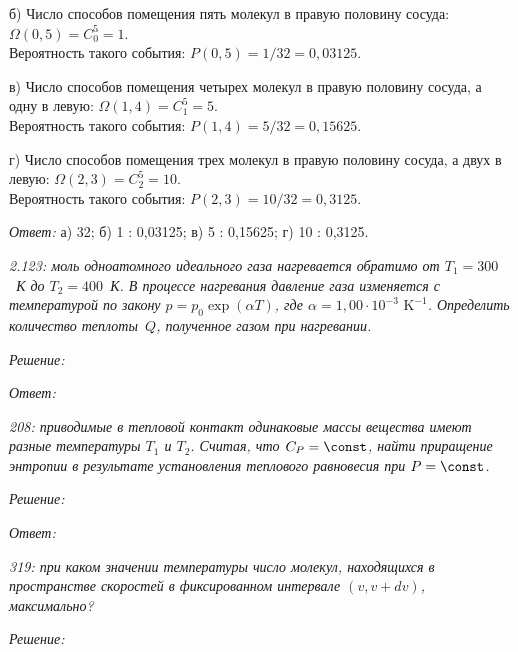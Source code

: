 \documentclass[pscyr]{hedsemwork}
\begin{document}
б) Число способов помещения пять молекул в правую половину сосуда:
\( \Omega(0, 5) = C_0^5 = 1 \).\\
Вероятность такого события: \( P(0, 5) = 1/32 = 0,\!03125 \).

в) Число способов помещения четырех молекул в правую половину сосуда, а одну в
левую: \( \Omega(1, 4) = C_1^5 = 5 \).\\
Вероятность такого события: \( P(1, 4) = 5/32 = 0,\!15625 \).

г) Число способов помещения трех молекул в правую половину сосуда, а двух в
левую: \( \Omega(2, 3) = C_2^5 = 10 \).\\
Вероятность такого события: \( P(2, 3) = 10/32 = 0,\!3125 \).

\vspace*{2em}
\emph{Ответ:} а) 32; б) 1 : 0,03125; в) 5 : 0,15625; г) 10 : 0,3125.

\newpage %

\emph{2.123: моль одноатомного идеального газа нагревается обратимо от
\( T_1 = 300 \)~К до \( T_2 = 400 \)~К. В процессе нагревания давление газа
изменяется с температурой по закону \( p = p_0 \exp(\alpha T) \), где
\( \alpha = 1,\!00 \cdot 10^{-3} \text{ K}^{-1} \). Определить количество
теплоты~\( Q \), полученное газом при нагревании.}

\vspace*{2em}
\emph{Решение:}

\vspace*{2em}
\emph{Ответ:}

\newpage %

\emph{208: приводимые в тепловой контакт одинаковые массы вещества имеют разные
температуры \( T_1 \) и \( T_2 \). Считая, что \( C_P = \const \), найти
приращение энтропии в результате установления теплового равновесия при
\( P = \const \).}

\vspace*{2em}
\emph{Решение:}

\vspace*{2em}
\emph{Ответ:}

\newpage %

\emph{319: при каком значении температуры число молекул, находящихся в
пространстве скоростей в фиксированном интервале \( (v, v + dv) \), максимально?}

\vspace*{2em}
\emph{Решение:}
\end{document}
